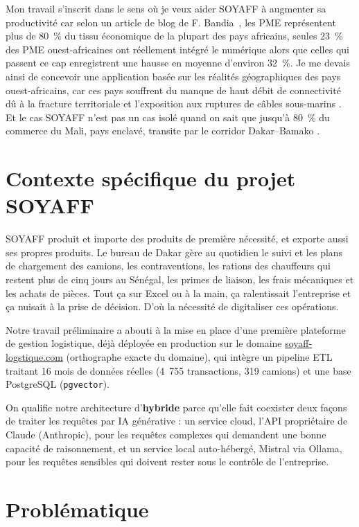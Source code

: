 Mon travail s'inscrit dans le sens où je veux aider SOYAFF à augmenter sa productivité car selon un article de blog de F. Bandia~\cite{fatimaAfriqueLOuestPME}, les PME représentent plus de 80~\% du tissu économique de la plupart des pays africains, seules 23~\% des PME ouest-africaines ont réellement intégré le numérique alors que celles qui passent ce cap enregistrent une hausse en moyenne d'environ 32~\%. Je me devais ainsi de concevoir une application basée sur les réalités géographiques des pays ouest-africains, car ces pays souffrent du manque de haut débit de connectivité dû à la fracture territoriale et l'exposition aux ruptures de câbles sous-marins \cite{cariolleInfrastructuresEconomieNumeriques2018}. Et le cas SOYAFF n'est pas un cas isolé quand on sait que jusqu'à 80~\% du commerce du Mali, pays enclavé, transite par le corridor Dakar--Bamako \cite{byiersActeursInteretsLong2022}.

\section*{Contexte spécifique du projet SOYAFF}
\label{sec:contexte_soyaff}

SOYAFF produit et importe des produits de première nécessité, et exporte aussi ses propres produits. Le bureau de Dakar gère au quotidien le suivi et les plans de chargement des camions, les contraventions, les rations des chauffeurs qui restent plus de cinq jours au Sénégal, les primes de liaison, les frais mécaniques et les achats de pièces. Tout ça sur Excel ou à la main, ça ralentissait l'entreprise et ça nuisait à la prise de décision. D'où la nécessité de digitaliser ces opérations.

Notre travail préliminaire a abouti à la mise en place d'une première plateforme de gestion logistique, déjà déployée en production sur le domaine \url{soyaff-logstique.com} (orthographe exacte du domaine), qui intègre un pipeline ETL traitant 16 mois de données réelles (4~755 transactions, 319 camions) et une base PostgreSQL (\texttt{pgvector}).

On qualifie notre architecture d'\textbf{hybride} parce qu'elle fait coexister deux façons de traiter les requêtes par IA générative : un service cloud, l'API propriétaire de Claude (Anthropic), pour les requêtes complexes qui demandent une bonne capacité de raisonnement, et un service local auto-hébergé, Mistral via Ollama, pour les requêtes sensibles qui doivent rester sous le contrôle de l'entreprise.

\section*{Problématique}
\label{sec:problematique}

